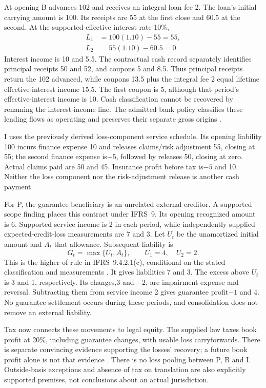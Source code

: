At opening B advances 102 and receives an integral loan fee 2. The loan's initial
carrying amount is 100. Its receipts are 55 at the first close and 60.5 at the
second. At the supported effective interest rate 10\%,
\begin{align}
 L_1&=100(1.10)-55=55,\\
 L_2&=55(1.10)-60.5=0.
\end{align}
Interest income is 10 and 5.5. The contractual cash record separately identifies
principal receipts 50 and 52, and coupons 5 and 8.5. Thus principal receipts return
the 102 advanced, while coupons 13.5 plus the integral fee 2 equal lifetime
effective-interest income 15.5. The first coupon is 5, although that period's
effective-interest income is 10. Cash classification cannot be recovered by
renaming the interest-income line. The admitted bank policy classifies these
lending flows as operating and preserves their separate gross origins
\citep[IAS~7.14--15,31--33; IFRS~9.B 5.4.1--B 5.4.4]{eu 20231803}.

I uses the previously derived loss-component service schedule. Its opening
liability 100 incurs finance expense 10 and releases claims/risk adjustment 55,
closing at 55; the second finance expense is\(-5\), followed by releases 50,
closing at zero. Actual claims paid are 50 and 45. Insurance profit before tax
is\(-5\) and 10. Neither the loss component nor the risk-adjustment release is
another cash payment.

For P, the guarantee beneficiary is an unrelated external creditor. A supported
scope finding places this contract under IFRS~9. Its opening recognized amount
is 6. Supported service income is 2 in each period, while independently supplied
expected-credit-loss measurements are 7 and 3. Let \(U_t\) be the unamortized
initial amount and \(A_t\) that allowance. Subsequent liability is
\begin{equation}
 G_t=\max\{U_t,A_t\},\qquad U_1=4,\quad U_2=2.
 \label{eq:sector-guarantee-higher-of}
\end{equation}
This is the higher-of rule in IFRS~9.4.2.1(c), conditional on the stated
classification and measurements \citep{eu 20231803}. It gives liabilities 7
and 3. The excess above \(U_t\) is 3 and 1, respectively. Its changes,3 and
\(-2\), are impairment expense and reversal. Subtracting them from service
income 2 gives guarantee profit\(-1\) and 4. No guarantee settlement occurs
during these periods, and consolidation does not remove an external liability.

Tax now connects these movements to legal equity. The supplied law taxes book
profit at 20\%, including guarantee changes, with usable loss carryforwards.
There is separate convincing evidence supporting the losses' recovery; a
future book profit alone is not that evidence
\citep[IAS~12.34--36,46--47]{eu 20231803}. There is no loss pooling between P,
B and I. Outside-basis exceptions and absence of tax on translation are also
explicitly supported premises, not conclusions about an actual jurisdiction.

